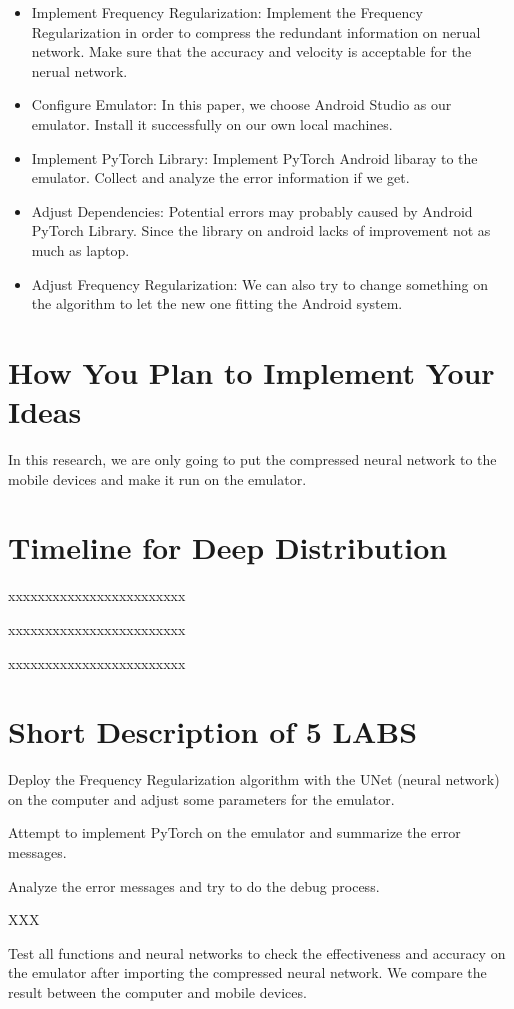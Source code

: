 \documentclass[UTF8]{article}
\begin{document}
\begin{itemize}
	\item Implement Frequency Regularization: Implement the Frequency Regularization in order to compress the redundant information on nerual network. Make sure that the accuracy and velocity is acceptable for the nerual network.
	
	\item Configure Emulator: In this paper, we choose Android Studio as our emulator. Install it successfully on our own local machines.
	
	\item Implement PyTorch Library: Implement PyTorch Android libaray to the emulator. Collect and analyze the error information if we get.
	
	\item Adjust Dependencies: Potential errors may probably caused by Android PyTorch Library. Since the library on android lacks of improvement not as much as laptop.
	
	\item Adjust Frequency Regularization: We can also try to change something on the algorithm to let the new one fitting the Android system.
	
\end{itemize}

\section*{How You Plan to Implement Your Ideas}

In this research, we are only going to put the compressed neural network to the mobile devices and make it run on the emulator. 



\section*{Timeline for Deep Distribution}

xxxxxxxxxxxxxxxxxxxxxxxx

xxxxxxxxxxxxxxxxxxxxxxxx

xxxxxxxxxxxxxxxxxxxxxxxx

\section*{Short Description of 5 LABS}

Deploy the Frequency Regularization algorithm with the UNet (neural network) on the computer and adjust some parameters for the emulator. 

Attempt to implement PyTorch on the emulator and summarize the error messages. 

Analyze the error messages and try to do the debug process. 

XXX

Test all functions and neural networks to check the effectiveness and accuracy on the emulator after importing the compressed neural network. We compare the result between the computer and mobile devices. 



\small

% 
  
\end{document}
